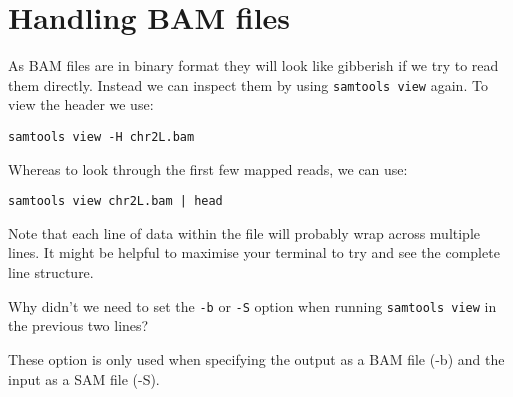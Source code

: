 \section{Handling BAM files}
\begin{steps}
As BAM files are in binary format they will look like gibberish if we try to read them directly.
Instead we can inspect them by using \texttt{samtools view} again.
To view the header we use:\\
\begin{lstlisting}
samtools view -H chr2L.bam
\end{lstlisting}
Whereas to look through the first few mapped reads, we can use:
\begin{lstlisting}
samtools view chr2L.bam | head
\end{lstlisting}
Note that each line of data within the file will probably wrap across multiple lines.
It might be helpful to maximise your terminal to try and see the complete line structure.
\end{steps}

\begin{questions}
Why didn't we need to set the \texttt{-b} or \texttt{-S} option when running \texttt{samtools view} in the previous two lines?\\
\begin{answer}
These option is only used when specifying the output as a BAM file (-b) and the input as a SAM file (-S).\\
\end{answer}
\end{questions}

